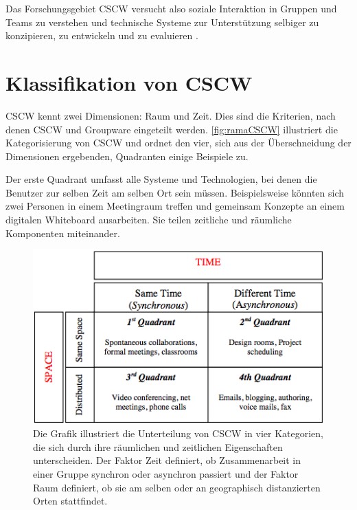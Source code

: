 	Das Forschungsgebiet CSCW versucht also soziale Interaktion in Gruppen und Teams zu verstehen und technische Systeme zur Unterstützung selbiger zu konzipieren, zu entwickeln und zu evaluieren \citep{Koch2008}.

\section{Klassifikation von CSCW}

CSCW kennt zwei Dimensionen: Raum und Zeit. Dies sind die Kriterien, nach denen CSCW und Groupware eingeteilt werden. \autoref{fig:ramaCSCW} illustriert die Kategorisierung von CSCW und ordnet den vier, sich aus der Überschneidung der Dimensionen ergebenden, Quadranten einige Beispiele zu. 

Der erste Quadrant umfasst alle Systeme und Technologien, bei denen die Benutzer zur selben Zeit am selben Ort sein müssen. Beispielsweise könnten sich zwei Personen in einem Meetingraum treffen und gemeinsam Konzepte an einem digitalen Whiteboard ausarbeiten. Sie teilen zeitliche und räumliche Komponenten miteinander. 

\begin{figure}
	\includegraphics[width=\textwidth]{gfx/ramaCSCWQuadranten.png}
	\caption[CSCW-Kategorien \newline \citep{Rama:2006p245}]{Die Grafik illustriert die Unterteilung von CSCW in vier Kategorien, die sich durch ihre räumlichen und zeitlichen Eigenschaften unterscheiden. Der Faktor Zeit definiert, ob Zusammenarbeit in einer Gruppe synchron oder asynchron passiert und der Faktor Raum definiert, ob sie am selben oder an geographisch distanzierten Orten stattfindet.}
	\label{fig:ramaCSCW}
\end{figure}

